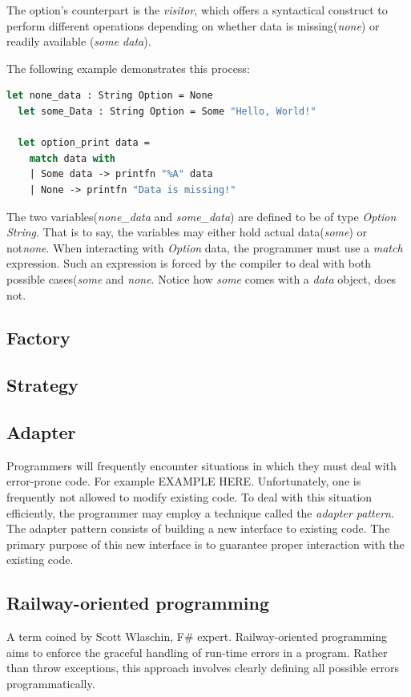 \documentclass{article}
\begin{document}
The option's counterpart is the {\em visitor}, which offers a syntactical construct to perform different operations depending on whether data
is missing({\em none}) or readily available ({\em some data}).

The following example demonstrates this process:

\begin{lstlisting}[language=Fsharp]
  let none_data : String Option = None
  let some_Data : String Option = Some "Hello, World!"

  let option_print data =
    match data with
    | Some data -> printfn "%A" data
    | None -> printfn "Data is missing!"
\end{lstlisting}

The two variables({\em none_data} and {\em some_data}) are defined to be of type {\em Option String}.
That is to say, the variables may either hold actual data({\em some}) or not{\em none}.
When interacting with {\em Option} data, the programmer must use a {\em match} expression.
Such an expression is forced by the compiler to deal with both possible cases({\em some} and {\em none}.
Notice how {\em some} comes with a {\em data} object, {\none} does not.

\subsection{Factory}
\subsection{Strategy}

\subsection{Adapter}
Programmers will frequently encounter situations in which they must deal with error-prone code.
For example {\huge EXAMPLE HERE}.
Unfortunately, one is frequently not allowed to modify existing code.
To deal with this situation efficiently, the programmer may employ a technique called the {\em adapter pattern}.
The adapter pattern consists of building a new interface to existing code.
The primary purpose of this new interface is to guarantee proper interaction with the existing code.

\subsection{Railway-oriented programming}
A term coined by Scott Wlaschin, F\# expert.
Railway-oriented programming aims to enforce the graceful handling of run-time errors in a program.
Rather than throw exceptions, this approach involves clearly defining all possible errors programmatically.
\end{document}
